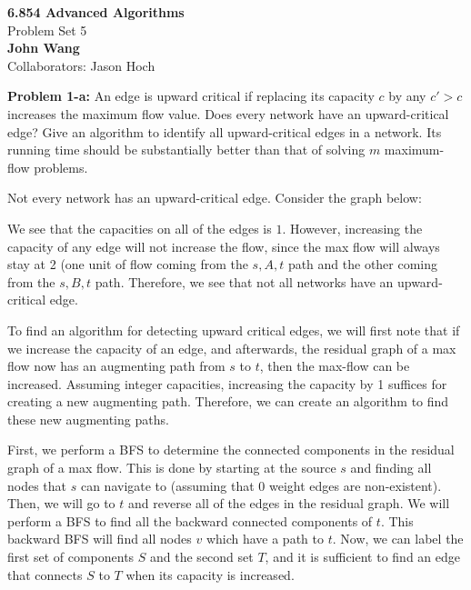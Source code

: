 \documentclass[psamsfonts]{amsart}
\newenvironment{sol}{\vspace{0.25cm}{\large \bfseries Solution:}}{\qedsymbol}
\newenvironment{prob}[1]{\begin{framed}{\large \bfseries Problem #1:}}{\end{framed}}
\newcommand{\makenewtitle}{
    \begin{center}
    {\huge \bfseries 6.854 Advanced Algorithms} \\
    Problem Set 5\\
    \vspace{0.25cm}
    {\bfseries John Wang} \\
    Collaborators: Jason Hoch
    \end{center}
    \vspace{0.5cm}
}
\begin{document}
\makenewtitle

\begin{prob}{1-a}
An edge is upward critical if replacing its capacity $c$ by any $c' > c$ increases the maximum flow value. Does every network have an upward-critical edge? Give an algorithm to identify all upward-critical edges in a network. Its running time should be substantially better than that of solving $m$ maximum-flow problems.
\end{prob}
\begin{sol}
Not every network has an upward-critical edge. Consider the graph below:
\begin{figure}[h!]
\centering
{}
\end{figure}

We see that the capacities on all of the edges is $1$. However, increasing the capacity of any edge will not increase the flow, since the max flow will always stay at 2 (one unit of flow coming from the $s, A, t$ path and the other coming from the $s, B, t$ path. Therefore, we see that not all networks have an upward-critical edge. 

To find an algorithm for detecting upward critical edges, we will first note that if we increase the capacity of an edge, and afterwards, the residual graph of a max flow now has an augmenting path from $s$ to $t$, then the max-flow can be increased. Assuming integer capacities, increasing the capacity by 1 suffices for creating a new augmenting path. Therefore, we can create an algorithm to find these new augmenting paths.

First, we perform a BFS to determine the connected components in the residual graph of a max flow. This is done by starting at the source $s$ and finding all nodes that $s$ can navigate to (assuming that 0 weight edges are non-existent). Then, we will go to $t$ and reverse all of the edges in the residual graph. We will perform a BFS to find all the backward connected components of $t$. This backward BFS will find all nodes $v$ which have a path to $t$. Now, we can label the first set of components $S$ and the second set $T$, and it is sufficient to find an edge that connects $S$ to $T$ when its capacity is increased. 


\end{sol}
\end{document}
